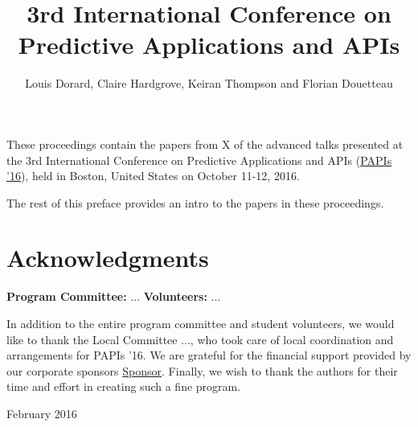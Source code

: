 \documentclass[wcp]{jmlrbook}
\title[PAPIs 2016]{3rd International Conference on Predictive Applications and APIs}
\author{Louis Dorard, Claire Hardgrove, Keiran Thompson and Florian Douetteau}
\subtitle{\thejmlrworkshop}
\begin{document}
\maketitle

\frontmatter

\begin{preface}

  These proceedings contain the papers from X of the advanced talks presented at the 3rd International Conference on Predictive Applications and APIs (\href{http://papis.io/2016}{PAPIs '16}), held in Boston, United States on October 11-12, 2016.

  The rest of this preface provides an intro to the papers in these proceedings.

  \section*{Acknowledgments}

  \textbf{Program Committee:}
  ...
  \textbf{Volunteers:}
  ...

  In addition to the entire program committee and student volunteers, we would like to thank the Local Committee ..., who took care of local coordination and arrangements for PAPIs '16.
  We are grateful for the financial support provided by our corporate sponsors \href{http://sponsor.com}{Sponsor}.
  Finally, we wish to thank the authors for their time and effort in creating such a fine program.

\begin{signoff}{February 2016}
\end{signoff}


\end{preface}

\tableofcontents

\mainmatter

\begin{jmlrpapers}
\end{jmlrpapers}
\end{document}
